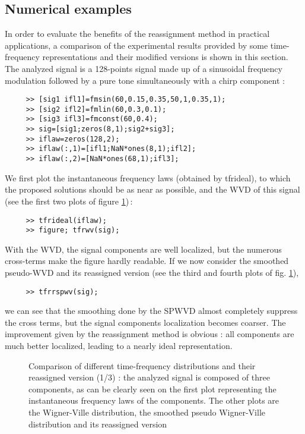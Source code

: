 \subsection{Numerical examples}
  In order to evaluate the benefits of the reassignment method in practical
applications, a comparison of the experimental results provided by some
time-frequency representations and their modified versions is shown in this
section. The analyzed signal is a 128-points signal made up of a sinusoidal
frequency modulation followed by a pure tone simultaneously with a chirp
component :
\begin{verbatim}
     >> [sig1 ifl1]=fmsin(60,0.15,0.35,50,1,0.35,1);
     >> [sig2 ifl2]=fmlin(60,0.3,0.1);
     >> [sig3 ifl3]=fmconst(60,0.4);
     >> sig=[sig1;zeros(8,1);sig2+sig3];
     >> iflaw=zeros(128,2);
     >> iflaw(:,1)=[ifl1;NaN*ones(8,1);ifl2];
     >> iflaw(:,2)=[NaN*ones(68,1);ifl3];
\end{verbatim}
We first plot the instantaneous frequency laws (obtained by {\ttfamily
tfrideal}), to which the proposed solutions should be as near as possible,
and the WVD of this signal (see the first two plots of figure
\ref{Re1fig2})\,:
\begin{verbatim}
     >> tfrideal(iflaw);
     >> figure; tfrwv(sig);
\end{verbatim}
With the WVD, the signal components are well localized, but the numerous
cross-terms make the figure hardly readable. If we now consider the
smoothed pseudo-WVD and its reassigned version (see the third and fourth
plots of fig. \ref{Re1fig2}),
\begin{verbatim}
     >> tfrrspwv(sig);
\end{verbatim}
we can see that the smoothing done by the SPWVD almost completely suppress
the cross terms, but the signal components localization becomes
coarser. The improvement given by the reassignment method is obvious : all
components are much better localized, leading to a nearly ideal
representation.
\begin{figure}[htb]
\epsfxsize=12cm
\epsfysize=12cm
\centerline{}
\caption{\label{Re1fig2}Comparison of different time-frequency
distributions and their reassigned version (1/3) : the analyzed signal is
composed of three components, as can be clearly seen on the first plot
representing the instantaneous frequency laws of the components. The other
plots are the Wigner-Ville distribution, the smoothed pseudo Wigner-Ville
distribution and its reassigned version}
\end{figure}
